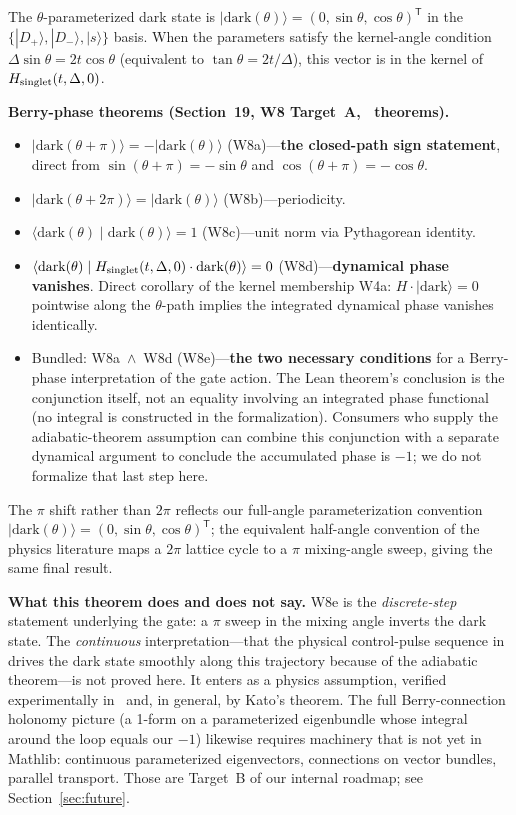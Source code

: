 \documentclass[aps,prd,twocolumn,showpacs,superscriptaddress,nofootinbib]{revtex4-2}
\newcommand{\ket}[1]{|#1\rangle}
\newcommand{\Dplus}{|D_+\rangle}
\newcommand{\Dminus}{|D_-\rangle}
\newcommand{\sstate}{|s\rangle}
\begin{document}
The $\theta$-parameterized dark state is
$\ket{\text{dark}(\theta)} = (0, \sin\theta, \cos\theta)^\mathsf{T}$
in the $\{\Dplus, \Dminus, \sstate\}$ basis. When the parameters
satisfy the kernel-angle condition
$\Delta\sin\theta = 2t\cos\theta$
(equivalent to $\tan\theta = 2t/\Delta$),
this vector is in the kernel of $H_{\rm singlet}(t, \Delta, 0)$.

\textbf{Berry-phase theorems (Section~19, W8 Target~A,
\fhdWaveEight{}~theorems).}
\begin{itemize}
\item $\ket{\text{dark}(\theta + \pi)} = -\ket{\text{dark}(\theta)}$
(W8a)---\textbf{the closed-path sign statement}, direct from
$\sin(\theta+\pi) = -\sin\theta$ and $\cos(\theta+\pi) = -\cos\theta$.
\item $\ket{\text{dark}(\theta + 2\pi)} = \ket{\text{dark}(\theta)}$
(W8b)---periodicity.
\item $\langle\text{dark}(\theta)\mid\text{dark}(\theta)\rangle = 1$
(W8c)---unit norm via Pythagorean identity.
\item $\langle\text{dark}(\theta)\mid H_{\rm singlet}(t,\Delta,0)\cdot\text{dark}(\theta)\rangle = 0$
(W8d)---\textbf{dynamical phase vanishes}. Direct corollary of the
kernel membership W4a: $H\cdot\ket{\text{dark}} = 0$ pointwise along
the $\theta$-path implies the integrated dynamical phase vanishes
identically.
\item Bundled: W8a~$\wedge$~W8d (W8e)---\textbf{the two necessary
conditions} for a Berry-phase interpretation of the gate action.
The Lean theorem's conclusion is the conjunction itself, not an
equality involving an integrated phase functional (no integral is
constructed in the formalization). Consumers who supply the
adiabatic-theorem assumption can combine this conjunction with a
separate dynamical argument to conclude the accumulated phase is
$-1$; we do not formalize that last step here.
\end{itemize}

The $\pi$ shift rather than $2\pi$ reflects our full-angle
parameterization convention
$\ket{\text{dark}(\theta)} = (0, \sin\theta, \cos\theta)^\mathsf{T}$;
the equivalent half-angle convention of the physics literature maps
a $2\pi$ lattice cycle to a $\pi$ mixing-angle sweep, giving the same
final result.

\textbf{What this theorem does and does not say.} W8e is the
\emph{discrete-step} statement underlying the gate: a $\pi$ sweep in
the mixing angle inverts the dark state. The \emph{continuous}
interpretation---that the physical control-pulse sequence in~\cite{Kiefer2026}
drives the dark state smoothly along this trajectory because of the
adiabatic theorem---is not proved here. It enters as a physics
assumption, verified experimentally in~\cite{Kiefer2026} and, in
general, by Kato's theorem. The full Berry-connection holonomy picture
(a 1-form on a parameterized eigenbundle whose integral around the loop
equals our $-1$) likewise requires machinery that is not yet in
Mathlib: continuous parameterized eigenvectors, connections on vector
bundles, parallel transport. Those are Target~B of our internal
roadmap; see Section~\ref{sec:future}.
\end{document}
